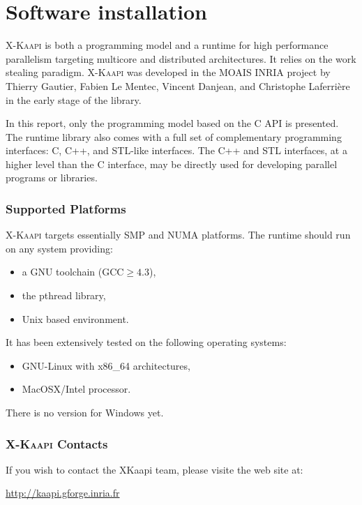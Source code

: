 \documentclass[a4paper, 11pt]{article}
\newcommand{\kaapi}{\textsc{X-Kaapi}\xspace}
\begin{document}
\makeRT %

\tableofcontents
{}

\newpage
\section{Software installation}\label{sec:userinstall}

\kaapi is both a programming model and a runtime for high performance parallelism targeting multicore and distributed architectures. 
It relies on the work stealing paradigm.
\kaapi was developed in the MOAIS INRIA project by Thierry Gautier, Fabien Le Mentec, Vincent Danjean, and Christophe Laferrière in the early stage of the library.

In this report, only the programming model based on the C API is presented.
The runtime library also comes with a full set of complementary programming interfaces: C, C++, and STL-like interfaces. The C++ and STL interfaces, at a higher level than the C interface, may be directly used for developing parallel programs or libraries.

\subsubsection*{Supported Platforms}
\kaapi targets essentially SMP and NUMA platforms. The runtime should run
on any system providing:
\begin{itemize}
\item a GNU toolchain ($\textrm{GCC} \ge 4.3$),
\item the pthread library,
\item Unix based environment.
\end{itemize}
It has been extensively tested on the following operating systems:
\begin{itemize}
\item GNU-Linux with x86\_64 architectures,
\item MacOSX/Intel processor.
\end{itemize}

There is no version for Windows yet.

\subsubsection*{\kaapi Contacts}
If you wish to contact the XKaapi team, please visite the web site at:
\begin{center}
\url{http://kaapi.gforge.inria.fr}
\end{center}
\end{document}
